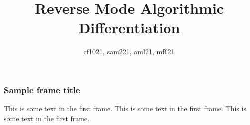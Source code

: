 \documentclass{beamer}
\title{Reverse Mode Algorithmic Differentiation}
\author{cf1021, sam221, aml21, mf621}
\institute{Imperial College London}
\date{}
\begin{document}
\frame{\titlepage}



% 







\begin{frame}
\frametitle{Sample frame title}
This is some text in the first frame. This is some text in the first frame. This is some text in the first frame.
\end{frame}
\end{document}
